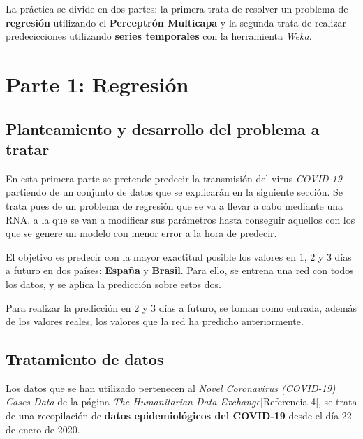 \documentclass[12pt,a4paper, xcolor=table]{article}
\begin{document}
  \vspace{5mm}

   La práctica se divide en dos partes: la primera trata de resolver un problema de \textbf{regresión} utilizando el \textbf{Perceptrón Multicapa} y la segunda trata de realizar predecicciones utilizando \textbf{series temporales} con la herramienta \textit{Weka}.

\newpage


\section{Parte 1: Regresión}

    \subsection{Planteamiento y desarrollo del problema a tratar}

    En esta primera parte se pretende predecir la transmisión del virus \textit{COVID-19} partiendo de un conjunto de datos que se explicarán en la siguiente sección. Se trata pues de un problema de regresión que se va a llevar a cabo mediante una RNA, a la que se van a modificar sus parámetros hasta conseguir aquellos con los que se genere un modelo con menor error a la hora de predecir.

    \vspace{2mm}

    El objetivo es predecir con la mayor exactitud posible los valores en 1, 2 y 3 días a futuro en dos países: \textbf{España} y \textbf{Brasil}. Para ello, se entrena una red con todos los datos, y se aplica la predicción sobre estos dos.

    \vspace{2mm}

    Para realizar la predicción en 2 y 3 días a futuro, se toman como entrada, además de los valores reales, los valores que la red ha predicho anteriormente.




    \subsection{Tratamiento de datos}

    Los datos que se han utilizado pertenecen al \textit{Novel Coronavirus (COVID-19) Cases Data} de la página \textit{The Humanitarian Data Exchange}[Referencia 4], se trata de una recopilación de \textbf{datos epidemiológicos del COVID-19} desde el día 22 de enero de 2020.
\end{document}
